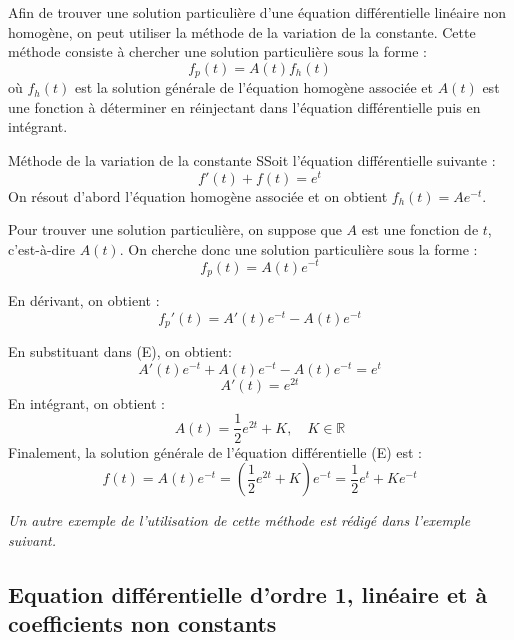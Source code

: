 \documentclass[a4paper,11pt]{article}
\begin{document}
            Afin de trouver une solution particulière d'une équation différentielle linéaire non homogène, on peut utiliser la méthode de la variation de la constante. 
            Cette méthode consiste à chercher une solution particulière sous la forme : $$ f_p(t) = A(t)f_h(t) $$
            où $f_h(t)$ est la solution générale de l'équation homogène associée et $A(t)$ est une fonction à déterminer en réinjectant dans l'équation différentielle puis en intégrant.
            
            \begin{exemple}{Méthode de la variation de la constante}
                SSoit l'équation différentielle suivante :
                \begin{equation}
                    \tag{E}
                    f'(t) + f(t) = e^t
                \end{equation}
                On résout d'abord l'équation homogène associée et on obtient $f_h(t) = A e^{-t}$.
                
                Pour trouver une solution particulière, on suppose que $A$ est une fonction de $t$, c'est-à-dire $A(t)$. On cherche donc une solution particulière sous la forme :
                    $$ f_p(t) = A(t)e^{-t} $$
                
                En dérivant, on obtient :
                    $$ f_p'(t) = A'(t)e^{-t} - A(t)e^{-t} $$
                
                En substituant dans (E), on obtient:
                    $$ A'(t)e^{-t} + A(t)e^{-t} - A(t)e^{-t} = e^t $$
                    $$ A'(t) = e^{2t} $$
                En intégrant, on obtient :
                    $$ A(t) = \frac{1}{2}e^{2t} + K, \quad K \in \mathbb{R} $$
                Finalement, la solution générale de l'équation différentielle (E) est :
                    $$ f(t) = A(t)e^{-t} = \left(\frac{1}{2}e^{2t} + K\right)e^{-t} = \frac{1}{2}e^t + Ke^{-t} $$
            \end{exemple}

            \textit{Un autre exemple de l'utilisation de cette méthode est rédigé dans l'exemple suivant.}

    \clearpage

    \subsection*{Equation différentielle d'ordre 1, linéaire et à coefficients non constants}
            
\end{document}

